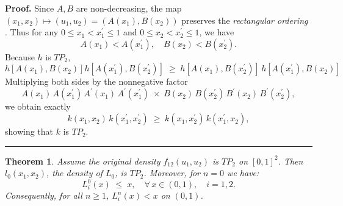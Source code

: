 \documentclass[onecolumn]{article}
\newtheorem{theorem}{Theorem}
\newenvironment{proof}[1][Proof]{\noindent\textbf{#1.} }{\ \rule{0.5em}{0.5em}}
\begin{document}
\begin{proof}
\noindent Since $A,B$ are non-decreasing, the map $(x_{1},x_{2})\mapsto
(u_{1},u_{2})=(A(x_{1}),B(x_{2}))$ preserves the \textit{rectangular ordering%
}. Thus for any $0\leq x_{1}<x_{1}^{\prime }\leq 1$ and $0\leq
x_{2}<x_{2}^{\prime }\leq 1$, we have 
\begin{equation}
A(x_{1})<A(x_{1}^{\prime }),\quad B(x_{2})<B(x_{2}^{\prime }).  \label{308}
\end{equation}%
Because $h$ is $TP_{2}$, 
\begin{equation}
h[A(x_{1}),B(x_{2})]h[A(x_{1}^{\prime }),B(x_{2}^{\prime })]\;\geq
\;h[A(x_{1}),B(x_{2}^{\prime })]\,h[A(x_{1}^{\prime }),B(x_{2})]  \label{309}
\end{equation}%
Multiplying both sides by the nonnegative factor 
\begin{equation}
A(x_{1})\,A(x_{1}^{\prime })\,A^{\prime }(x_{1})\,A^{\prime }(x_{1}^{\prime
})\;\times \;B(x_{2})\,B(x_{2}^{\prime })\,B^{\prime }(x_{2})\,B^{\prime
}(x_{2}^{\prime }),  \label{310}
\end{equation}%
we obtain exactly 
\begin{equation}
k(x_{1},x_{2})\,k(x_{1}^{\prime },x_{2}^{\prime })\;\geq
\;k(x_{1},x_{2}^{\prime })\,k(x_{1}^{\prime },x_{2}),  \label{311}
\end{equation}%
showing that $k$ is $TP_{2}$.
\end{proof}

\begin{theorem}
\label{subdiag} Assume the original density $f_{12}(u_{1},u_{2})$ is $TP_{2}$
on $[0,1]^{2}$. Then $l_{0}(x_{1},x_{2})$, the density of $L_{0}$, is $%
TP_{2} $. Moreover, for $n=0$ we have: 
\begin{equation}
L_{i}^{0}(x)\;\leq \;x,\quad \forall \,x\in (0,1),\quad i=1,2.  \label{312}
\end{equation}%
Consequently, for all $n\geq 1$, $L_{i}^{n}(x)<x$ on $(0,1)$.
\end{theorem}
\end{document}
